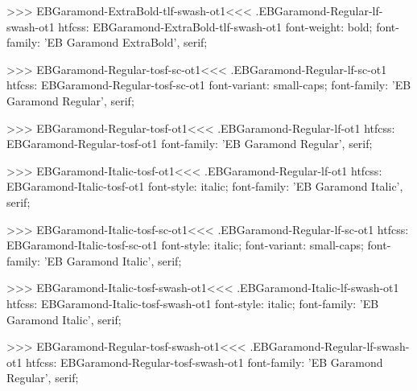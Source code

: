 {{{{{{{>>>
\<EBGaramond-ExtraBold-tlf-swash-ot1\><<<
.EBGaramond-Regular-lf-swash-ot1
htfcss:  EBGaramond-ExtraBold-tlf-swash-ot1  font-weight: bold; font-family: 'EB Garamond ExtraBold', serif;

>>>
\<EBGaramond-Regular-tosf-sc-ot1\><<<
.EBGaramond-Regular-lf-sc-ot1
htfcss:  EBGaramond-Regular-tosf-sc-ot1  font-variant: small-caps; font-family: 'EB Garamond Regular', serif;

>>>
\<EBGaramond-Regular-tosf-ot1\><<<
.EBGaramond-Regular-lf-ot1
htfcss:  EBGaramond-Regular-tosf-ot1  font-family: 'EB Garamond Regular', serif;

>>>
\<EBGaramond-Italic-tosf-ot1\><<<
.EBGaramond-Regular-lf-ot1
htfcss:  EBGaramond-Italic-tosf-ot1  font-style: italic; font-family: 'EB Garamond Italic', serif;

>>>
\<EBGaramond-Italic-tosf-sc-ot1\><<<
.EBGaramond-Regular-lf-sc-ot1
htfcss:  EBGaramond-Italic-tosf-sc-ot1  font-style: italic; font-variant: small-caps; font-family: 'EB Garamond Italic', serif;

>>>
\<EBGaramond-Italic-tosf-swash-ot1\><<<
.EBGaramond-Italic-lf-swash-ot1
htfcss:  EBGaramond-Italic-tosf-swash-ot1  font-style: italic; font-family: 'EB Garamond Italic', serif;

>>>
\<EBGaramond-Regular-tosf-swash-ot1\><<<
.EBGaramond-Regular-lf-swash-ot1
htfcss:  EBGaramond-Regular-tosf-swash-ot1  font-family: 'EB Garamond Regular', serif;

}}}}}}}
